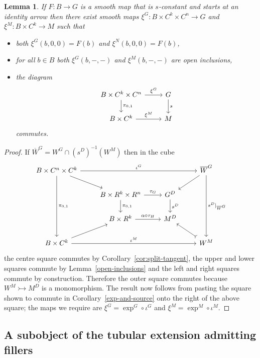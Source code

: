 \documentclass[10pt,a4paper]{amsart}
\numberwithin{equation}{section}
\newtheorem{Lemma}[Theorem]{Lemma}
\begin{document}
\begin{Lemma}If $F\colon B\rightarrow G$ is a smooth map that is $s$-constant and starts at an identity arrow then there exist smooth maps $\xi^G\colon B\times C^k\times C^n\rightarrow G$ and $\xi^M\colon B\times C^k\rightarrow M$ such that
\begin{itemize}\itemsep=0pt
\item both $\xi^G(b,0,0)=F(b)$ and $\xi^N(b,0,0)=F(b)$,
\item for all $b\in B$ both $\xi^G(b,-,-)$ and $\xi^M(b,-,-)$ are open inclusions,
\item the diagram
\begin{equation*}\begin{tikzcd}
B\times C^k\times C^n \dar{\pi_{0,1}} \rar{\xi^G} & G \dar{s}\\
B\times C^k \rar{\xi^M} & M
\end{tikzcd}\end{equation*}
commutes.
\end{itemize}
\end{Lemma}
\begin{proof} If $\overline{W}^G=W^G \cap (s^D)^{-1}(W^M)$ then in the cube
\begin{equation*}\begin{tikzcd}
B\times C^n\times C^k \drar \arrow{rrr}{\iota^G} \arrow{ddd}{\pi_{0,1}} &&& \overline{W}^G \dlar \arrow{ddd}{s^D|_{\overline{W}^G}}\\
&B\times R^k\times R^n \dar{\pi_{0,1}} \rar{\tau_G} & G^D \dar{s^D} &\\
& B\times R^k \rar{\alpha\circ\tau_H} & M^D &\\
B\times C^k \urar \arrow{rrr}{\iota^M} &&& W^M \ular[rightarrowtail]
\end{tikzcd}\end{equation*}
the centre square commutes by Corollary~\ref{cor:split-tangent}, the upper and lower squares commute by Lemma~\ref{open-inclusions} and the left and right squares commute by construction. Therefore the outer square commutes because~$W^M\rightarrowtail M^D$ is a monomorphism. The result now follows from \mbox{pasting} the square shown to commute in Corollary~\ref{exp-and-source} onto the right of the above square; the maps we require are $\xi^G = \exp^G\circ \iota^G$ and $\xi^M = \exp^M\circ\iota^M$.
\end{proof}

\subsection{A subobject of the tubular extension admitting f\/illers}\label{subobject-with-fillers}
\end{document}
